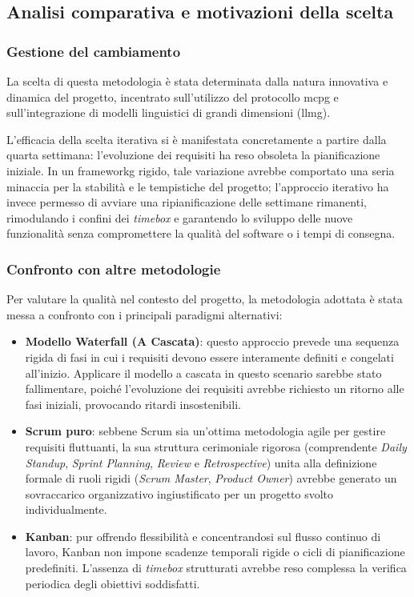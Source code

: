 \subsection{Analisi comparativa e motivazioni della scelta}
\subsubsection{Gestione del cambiamento}
La scelta di questa metodologia è stata determinata dalla natura innovativa e dinamica del progetto, incentrato sull'utilizzo del protocollo \gls{mcpg} e sull'integrazione di modelli linguistici di grandi dimensioni (\gls{llmg}).

L'efficacia della scelta iterativa si è manifestata concretamente a partire dalla quarta settimana: l'evoluzione dei requisiti ha reso obsoleta la pianificazione iniziale. In un \gls{frameworkg} rigido, tale variazione avrebbe comportato una seria minaccia per la stabilità e le tempistiche del progetto; l'approccio iterativo ha invece permesso di avviare una ripianificazione delle settimane rimanenti, rimodulando i confini dei \textit{timebox} e garantendo lo sviluppo delle nuove funzionalità senza compromettere la qualità del software o i tempi di consegna.

\subsubsection{Confronto con altre metodologie}
Per valutare la qualità nel contesto del progetto, la metodologia adottata è stata messa a confronto con i principali paradigmi alternativi:
\begin{itemize}
\item \textbf{Modello Waterfall (A Cascata)}: questo approccio prevede una sequenza rigida di fasi in cui i requisiti devono essere interamente definiti e congelati all'inizio. Applicare il modello a cascata in questo scenario sarebbe stato fallimentare, poiché l'evoluzione dei requisiti avrebbe richiesto un ritorno alle fasi iniziali, provocando ritardi insostenibili.
\item \textbf{Scrum puro}: sebbene Scrum sia un'ottima metodologia agile per gestire requisiti fluttuanti, la sua struttura cerimoniale rigorosa (comprendente \textit{Daily Standup}, \textit{Sprint Planning}, \textit{Review} e \textit{Retrospective}) unita alla definizione formale di ruoli rigidi (\textit{Scrum Master}, \textit{Product Owner}) avrebbe generato un sovraccarico organizzativo ingiustificato per un progetto svolto individualmente.
\item \textbf{Kanban}: pur offrendo flessibilità e concentrandosi sul flusso continuo di lavoro, Kanban non impone scadenze temporali rigide o cicli di pianificazione predefiniti. L'assenza di \textit{timebox} strutturati avrebbe reso complessa la verifica periodica degli obiettivi soddisfatti.
\end{itemize}

